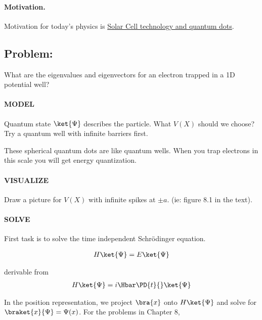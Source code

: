%
%

\paragraph{Motivation.}  Motivation for today's physics is \href{http://physicsworld.com/cws/article/news/38046}{Solar Cell technology and quantum dots}.

\subsection{Problem:}
What are the eigenvalues and eigenvectors for an electron trapped in a 1D potential well?

\paragraph{MODEL}
Quantum state $\ket{\Psi}$ describes the particle.  What $V(X)$ should we choose?  Try a quantum well with infinite barriers first.

These spherical quantum dots are like quantum wells.  When you trap electrons in this scale you will get energy quantization.

\paragraph{VISUALIZE}
Draw a picture for $V(X)$ with infinite spikes at $\pm a$. (ie: figure 8.1 in the text).

\paragraph{SOLVE}
First task is to solve the time independent Schr\"{o}dinger equation.

\begin{align}\label{eqn:PHY356Lecture9:1}
H \ket{\Psi} = E \ket{\Psi}
\end{align}

derivable from
\begin{align}\label{eqn:PHY356Lecture9:2}
H \ket{\Psi} = i \Hbar \PD{t}{} \ket{\Psi}
\end{align}

In the position representation, we project $\bra{x}$ onto $H \ket{\Psi}$ and solve for $\braket{x}{\Psi} = \Psi(x)$.  For the problems in Chapter 8,


